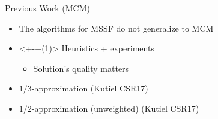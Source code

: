 \begin{frame}{Previous Work (MCM)}
\begin{itemize}[<+>]
	\item The algorithms for MSSF do not generalize to MCM  
	\item<+-+(1)> Heuristics + experiments
  		\begin{itemize}[<+>]
  			\item Solution's quality \alert{matters}
		\end{itemize}
	\item $1/3$-approximation (Kutiel CSR17) 
	\item $1/2$-approximation (unweighted) (Kutiel CSR17) 
\end{itemize}
\end{frame}